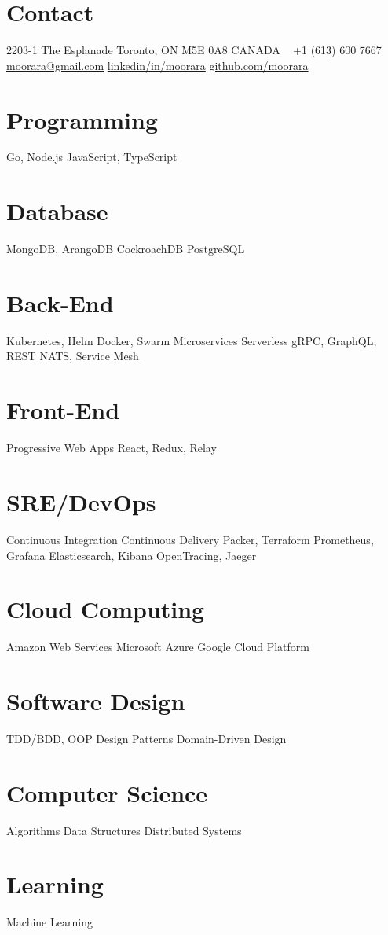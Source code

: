 \documentclass[]{cv-style}                     %
\begin{document}
\lastupdated



\begin{aside}
%
\section{Contact}
2203-1 The Esplanade
Toronto, ON  M5E 0A8
CANADA
~
+1 (613) 600 7667
~
\href{mailto:moorara@gmail.com}{moorara@gmail.com}
\href{http://linkedin.com/in/moorara}{linkedin/in/moorara}
\href{http://github.com/moorara}{github.com/moorara}
%
\section{Programming}
Go, Node.js
JavaScript, TypeScript
%
\section{Database}
MongoDB, ArangoDB
CockroachDB
PostgreSQL
%
\section{Back-End}
Kubernetes, Helm
Docker, Swarm
Microservices
Serverless
gRPC, GraphQL, REST
NATS, Service Mesh
%
\section{Front-End}
Progressive Web Apps
React, Redux, Relay
%
\section{SRE/DevOps}
Continuous Integration
Continuous Delivery
Packer, Terraform
Prometheus, Grafana
Elasticsearch, Kibana
OpenTracing, Jaeger
%
\section{Cloud Computing}
Amazon Web Services
Microsoft Azure
Google Cloud Platform
%
\section{Software Design}
TDD/BDD, OOP
Design Patterns
Domain-Driven Design
%
\section{Computer Science}
Algorithms
Data Structures
Distributed Systems
%
\section{Learning}
Machine Learning
%
\end{aside}
\end{document}

